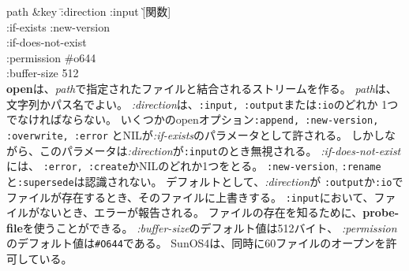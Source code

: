 \begin{refdesc}


{path \&key \= :direction :input \` [関数]\\
 \> :if-exists :new-version \\
 \> :if-does-not-exist \\
 \> :permission \#o644 \\
 \> :buffer-size 512\\}{
{\bf open}は、{\em path}で指定されたファイルと結合されるストリームを作る。
{\em path}は、文字列かパス名でよい。
{\em :direction}は、{\tt :input, :output}または{\tt :io}のどれか
1つでなければならない。
いくつかのopenオプション{\tt :append, :new-version, :overwrite, :error}
とNILが{\em :if-exists}のパラメータとして許される。
しかしながら、このパラメータは{\em :direction}が{\tt :input}のとき無視される。
{\em :if-does-not-exist}には、
{\tt :error, :create}かNILのどれか1つをとる。
{\tt :new-version}, {\tt :rename}と{\tt :supersede}は認識されない。
デフォルトとして、{\em :direction}が
{\tt :output}か{\tt :io}でファイルが存在するとき、そのファイルに上書きする。
{\tt :input}において、ファイルがないとき、エラーが報告される。
ファイルの存在を知るために、{\bf probe-file}を使うことができる。
{\em :buffer-size}のデフォルト値は512バイト、
{\em :permission}のデフォルト値は{\tt \#O644}である。
SunOS4は、同時に60ファイルのオープンを許可している。
}




\end{refdesc}
